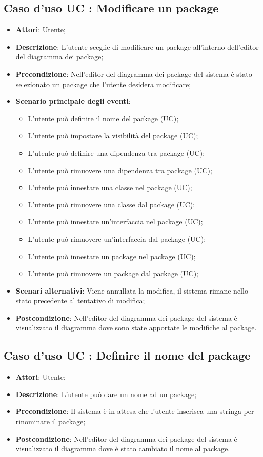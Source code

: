 \documentclass[../AnalisiDeiRequisiti.tex]{subfiles}
\begin{document}
		\subsection{Caso d'uso UC : Modificare un package}
			\begin{itemize}
				\item \textbf{Attori}: Utente;
				\item \textbf{Descrizione}: L'utente sceglie di modificare un package
				all'interno dell'editor del diagramma dei package;
				\item \textbf{Precondizione}: Nell'editor del diagramma dei package del
				sistema è stato selezionato un package che l'utente desidera modificare;
				\item \textbf{Scenario principale degli eventi}:
					\begin{itemize}
						\item L'utente può definire il nome del package (UC);
						\item L'utente può impostare la visibilità del package (UC);
						\item L'utente può definire una dipendenza tra package (UC);
						\item L'utente può rimuovere una dipendenza tra package (UC);
						\item L'utente può innestare una classe nel package (UC);
						\item L'utente può rimuovere una classe dal package (UC);
						\item L'utente può innestare un'interfaccia nel package (UC);
						\item L'utente può rimuovere un'interfaccia dal package (UC);
						\item L'utente può innestare un package nel package (UC);
						\item L'utente può rimuovere un package dal package (UC);
					\end{itemize}
				\item \textbf{Scenari alternativi}: Viene annullata la modifica, il sistema
				rimane nello stato precedente al tentativo di modifica;
				\item \textbf{Postcondizione}: Nell'editor del diagramma dei package del
				sistema è visualizzato il diagramma dove sono state apportate le modifiche
				al package.
			\end{itemize}
		\subsection{Caso d'uso UC : Definire il nome del package}
			\begin{itemize}
				\item \textbf{Attori}: Utente;
				\item \textbf{Descrizione}: L'utente può dare un nome ad un package;
				\item \textbf{Precondizione}: Il sistema è in attesa che l'utente inserisca
				una stringa per rinominare il package;
				\item \textbf{Postcondizione}: Nell'editor del diagramma dei package del
				sistema è visualizzato il diagramma dove è stato cambiato il nome
				al package.
			\end{itemize}
\end{document}
